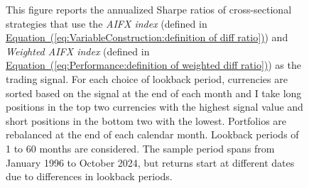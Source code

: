 \documentclass[12pt,oneside,letter]{article}
\newcommand*{\myeq}[1]{\hyperref[{#1}]{Equation~(\ref*{#1})}}
\begin{document}
\begin{landscape}
\begin{figure}
	
	    \begin{small}
	    This figure reports the annualized Sharpe ratios of cross-sectional strategies that use the \textit{AIFX index} (defined in \myeq{eq:VariableConstruction:definition of diff ratio}) and \textit{Weighted AIFX index} (defined in \myeq{eq:Performance:definition of weighted diff ratio}) as the trading signal. For each choice of lookback period, currencies are sorted based on the signal at the end of each month and I take long positions in the top two currencies with the highest signal value and short positions in the bottom two with the lowest. Portfolios are rebalanced at the end of each calendar month. Lookback periods of 1 to 60 months are considered. The sample period spans from January 1996 to October 2024, but returns start at different dates due to differences in lookback periods.
	    \end{small}


	\end{figure}

\end{landscape}
\end{document}
